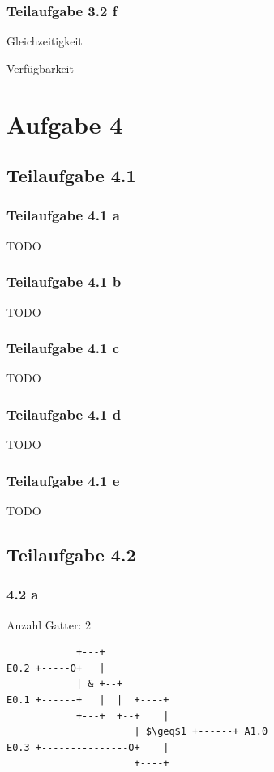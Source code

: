 \documentclass[a4paper]{scrartcl}
\begin{document}
  \subsubsection*{Teilaufgabe 3.2 f}
  \begin{enumerate*}[label=(\arabic*)]
      \item Gleichzeitigkeit
      \item Verfügbarkeit
  \end{enumerate*}

  \section*{Aufgabe 4}
  \subsection*{Teilaufgabe 4.1}
  \subsubsection*{Teilaufgabe 4.1 a}
  TODO

  \subsubsection*{Teilaufgabe 4.1 b}
  TODO

  \subsubsection*{Teilaufgabe 4.1 c}
  TODO

  \subsubsection*{Teilaufgabe 4.1 d}
  TODO

  \subsubsection*{Teilaufgabe 4.1 e}
  TODO

  \subsection*{Teilaufgabe 4.2}
  \subsubsection*{4.2 a}
  Anzahl Gatter: $2$
  \begin{lstlisting}
            +---+
E0.2 +-----O+   |
            | & +--+
E0.1 +------+   |  |  +----+
            +---+  +--+    |
                      | $\geq$1 +------+ A1.0
E0.3 +---------------O+    |
                      +----+
  \end{lstlisting}
\end{document}
